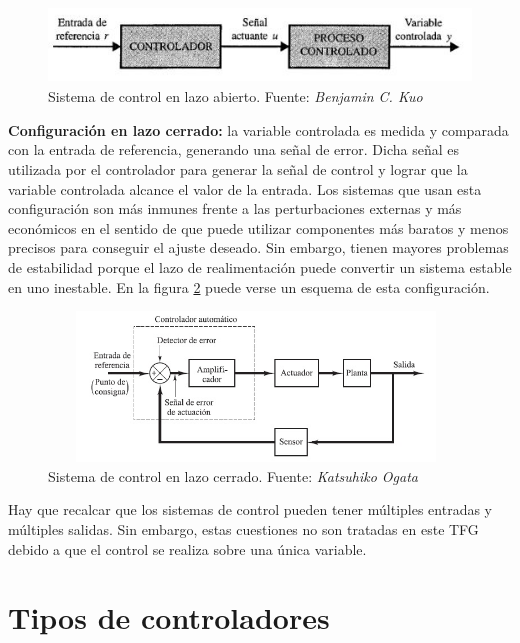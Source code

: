 \begin{figure}[htbp]
	\centering
	\includegraphics[width=120mm, height=20mm]{imagenes/capitulo2/2_1_1LazoAbierto}
   	\caption{Sistema de control en lazo abierto. Fuente: \textit{Benjamin C. Kuo}\cite{control2}}
   	\label{fig2_1:esquemacontrol}
\end{figure}

	\textbf{Configuración en lazo cerrado:} la variable controlada es medida y comparada con la entrada de referencia, generando una señal de error. Dicha señal es utilizada por el controlador para generar la señal de control y lograr que la variable controlada alcance el valor de la entrada. Los sistemas que usan esta configuración son más inmunes frente a las perturbaciones externas y más económicos en el sentido de que puede utilizar componentes más baratos y menos precisos para conseguir el ajuste deseado. Sin embargo, tienen mayores problemas de estabilidad porque el lazo de realimentación puede convertir un sistema estable en uno inestable. En la figura \ref{fig2_2:esquemacontrol} puede verse un esquema de esta configuración.

\begin{figure}[htbp]
	\centering
	\includegraphics[width=110mm, height=40mm]{imagenes/capitulo2/2_1_2LazoCerrado}
   	\caption{Sistema de control en lazo cerrado. Fuente: \textit{Katsuhiko Ogata} \cite{control1}}
   	\label{fig2_2:esquemacontrol}
\end{figure}

	Hay que recalcar que los sistemas de control pueden tener múltiples entradas y múltiples salidas. Sin embargo, estas cuestiones no son tratadas en este TFG debido a que el control se realiza sobre una única variable.

\section{Tipos de controladores}

